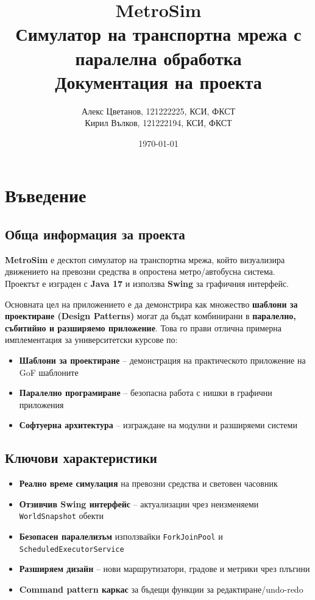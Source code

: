 \documentclass{article}
\title{\Huge\textbf{MetroSim} \\
	\Large Симулатор на транспортна мрежа с паралелна обработка \\
	\large Документация на проекта}
\author{Алекс Цветанов, 121222225, КСИ, ФКСТ\\Кирил Вълков, 121222194, КСИ, ФКСТ}
\date{\today}
\begin{document}
	
	\maketitle
	\newpage
	
	\tableofcontents
	\newpage
	
	\section{Въведение}
	
	\subsection{Обща информация за проекта}
	
	\textbf{MetroSim} е десктоп симулатор на транспортна мрежа, който визуализира движението на превозни средства в опростена метро/автобусна система. Проектът е изграден с \textbf{Java 17} и използва \textbf{Swing} за графичния интерфейс.
	
	Основната цел на приложението е да демонстрира как множество \textbf{шаблони за проектиране (Design Patterns)} могат да бъдат комбинирани в \textbf{паралелно, събитийно и разширяемо приложение}. Това го прави отлична примерна имплементация за университетски курсове по:
	
	\begin{itemize}
		\item \textbf{Шаблони за проектиране} – демонстрация на практическото приложение на GoF шаблоните
		\item \textbf{Паралелно програмиране} – безопасна работа с нишки в графични приложения
		\item \textbf{Софтуерна архитектура} – изграждане на модулни и разширяеми системи
	\end{itemize}
	
	\subsection{Ключови характеристики}
	
	\begin{itemize}
		\item \textbf{Реално време симулация} на превозни средства и световен часовник
		\item \textbf{Отзивчив Swing интерфейс} – актуализации чрез неизменяеми \texttt{WorldSnapshot} обекти
		\item \textbf{Безопасен паралелизъм} използвайки \texttt{ForkJoinPool} и \texttt{ScheduledExecutorService}
		\item \textbf{Разширяем дизайн} – нови маршрутизатори, градове и метрики чрез плъгини
		\item \textbf{Command pattern каркас} за бъдещи функции за редактиране/undo-redo
	\end{itemize}
	
\end{document}
